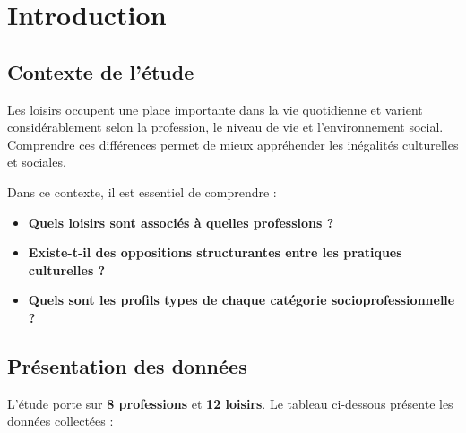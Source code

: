 \documentclass[12pt,a4paper]{book}
\begin{document}
	
	
	\chapter{Introduction}
	
	\section{Contexte de l'étude}
	
	Les loisirs occupent une place importante dans la vie quotidienne et varient considérablement selon la profession, le niveau de vie et l'environnement social. Comprendre ces différences permet de mieux appréhender les inégalités culturelles et sociales.
	
	\vspace{0.5cm}
	
	Dans ce contexte, il est essentiel de comprendre :
	\begin{itemize}
		\item \textbf{Quels loisirs sont associés à quelles professions ?}
		\item \textbf{Existe-t-il des oppositions structurantes entre les pratiques culturelles ?}
		\item \textbf{Quels sont les profils types de chaque catégorie socioprofessionnelle ?}
	\end{itemize}
	
	\section{Présentation des données}
	
	L'étude porte sur \textbf{8 professions} et \textbf{12 loisirs}. Le tableau ci-dessous présente les données collectées :
	
	\vspace{0.5cm}
	
\end{document}
